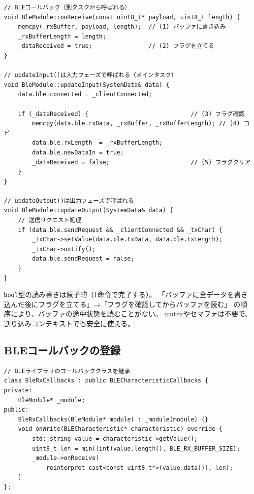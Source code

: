 \begin{lstlisting}[style=cppstyle, caption={BleModule.cpp — データ受け渡しの流れ}]
// BLEコールバック（別タスクから呼ばれる）
void BleModule::onReceive(const uint8_t* payload, uint8_t length) {
    memcpy(_rxBuffer, payload, length);  // (1) バッファに書き込み
    _rxBufferLength = length;
    _dataReceived = true;                // (2) フラグを立てる
}

// updateInput()は入力フェーズで呼ばれる（メインタスク）
void BleModule::updateInput(SystemData& data) {
    data.ble.connected = _clientConnected;

    if (_dataReceived) {                             // (3) フラグ確認
        memcpy(data.ble.rxData, _rxBuffer, _rxBufferLength); // (4) コピー
        data.ble.rxLength  = _rxBufferLength;
        data.ble.newDataIn = true;
        _dataReceived = false;                       // (5) フラグクリア
    }
}

// updateOutput()は出力フェーズで呼ばれる
void BleModule::updateOutput(SystemData& data) {
    // 送信リクエスト処理
    if (data.ble.sendRequest && _clientConnected && _txChar) {
        _txChar->setValue(data.ble.txData, data.ble.txLength);
        _txChar->notify();
        data.ble.sendRequest = false;
    }
}
\end{lstlisting}

\begin{pointbox}[volatileフラグ方式の安全性]
\texttt{bool}型の読み書きは原子的（1命令で完了する）。
「バッファに全データを書き込んだ後にフラグを立てる」→「フラグを確認してからバッファを読む」
の順序により、バッファの途中状態を読むことがない。
mutexやセマフォは不要で、割り込みコンテキストでも安全に使える。
\end{pointbox}

\subsection{BLEコールバックの登録}

\begin{lstlisting}[style=cppstyle, caption={BleModule.cpp — コールバッククラス}]
// BLEライブラリのコールバッククラスを継承
class BleRxCallbacks : public BLECharacteristicCallbacks {
private:
    BleModule* _module;
public:
    BleRxCallbacks(BleModule* module) : _module(module) {}
    void onWrite(BLECharacteristic* characteristic) override {
        std::string value = characteristic->getValue();
        uint8_t len = min((int)value.length(), BLE_RX_BUFFER_SIZE);
        _module->onReceive(
            reinterpret_cast<const uint8_t*>(value.data()), len);
    }
};
\end{lstlisting}

